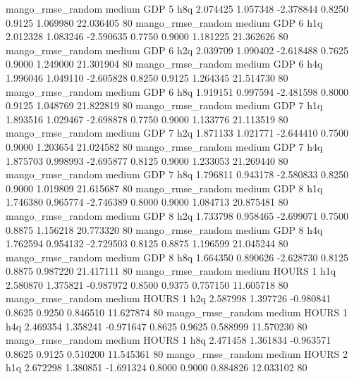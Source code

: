 mango_rmse_random     medium      GDP                 5                  h8q  2.074425 1.057348 -2.378844 0.8250 0.9125  1.069980   22.036405 80
mango_rmse_random     medium      GDP                 6                  h1q  2.012328 1.083246 -2.590635 0.7750 0.9000  1.181225   21.362626 80
mango_rmse_random     medium      GDP                 6                  h2q  2.039709 1.090402 -2.618488 0.7625 0.9000  1.249000   21.301904 80
mango_rmse_random     medium      GDP                 6                  h4q  1.996046 1.049110 -2.605828 0.8250 0.9125  1.264345   21.514730 80
mango_rmse_random     medium      GDP                 6                  h8q  1.919151 0.997594 -2.481598 0.8000 0.9125  1.048769   21.822819 80
mango_rmse_random     medium      GDP                 7                  h1q  1.893516 1.029467 -2.698878 0.7750 0.9000  1.133776   21.113519 80
mango_rmse_random     medium      GDP                 7                  h2q  1.871133 1.021771 -2.644410 0.7500 0.9000  1.203654   21.024582 80
mango_rmse_random     medium      GDP                 7                  h4q  1.875703 0.998993 -2.695877 0.8125 0.9000  1.233053   21.269440 80
mango_rmse_random     medium      GDP                 7                  h8q  1.796811 0.943178 -2.580833 0.8250 0.9000  1.019809   21.615687 80
mango_rmse_random     medium      GDP                 8                  h1q  1.746380 0.965774 -2.746389 0.8000 0.9000  1.084713   20.875481 80
mango_rmse_random     medium      GDP                 8                  h2q  1.733798 0.958465 -2.699071 0.7500 0.8875  1.156218   20.773320 80
mango_rmse_random     medium      GDP                 8                  h4q  1.762594 0.954132 -2.729503 0.8125 0.8875  1.196599   21.045244 80
mango_rmse_random     medium      GDP                 8                  h8q  1.664350 0.890626 -2.628730 0.8125 0.8875  0.987220   21.417111 80
mango_rmse_random     medium    HOURS                 1                  h1q  2.580870 1.375821 -0.987972 0.8500 0.9375  0.757150   11.605718 80
mango_rmse_random     medium    HOURS                 1                  h2q  2.587998 1.397726 -0.980841 0.8625 0.9250  0.846510   11.627874 80
mango_rmse_random     medium    HOURS                 1                  h4q  2.469354 1.358241 -0.971647 0.8625 0.9625  0.588999   11.570230 80
mango_rmse_random     medium    HOURS                 1                  h8q  2.471458 1.361834 -0.963571 0.8625 0.9125  0.510200   11.545361 80
mango_rmse_random     medium    HOURS                 2                  h1q  2.672298 1.380851 -1.691324 0.8000 0.9000  0.884826   12.033102 80
